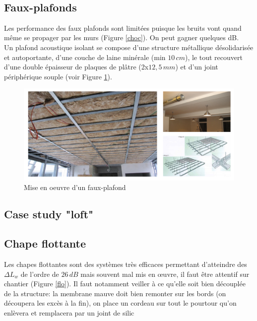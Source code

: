\documentclass[11pt]{report}
\begin{document}
\vspace{5mm}
\\


\subsection{Faux-plafonds}
\label{faux}
Les performance des faux plafonds sont limitées puisque les bruits vont quand même se propager par les murs (Figure \ref{choc}). On peut gagner quelques dB.\\

Un plafond acoustique isolant se compose d'une structure métallique désolidarisée et autoportante, d'une couche de laine minérale (min $10\,cm$), le tout recouvert d'une double épaisseur de plaques de plâtre (2x$12,5\,mm$) et d'un joint périphérique souple (voir Figure \ref{fp}).

\begin{figure}[ht]
\centering
\includegraphics[width=\linewidth]{fp}
\caption{Mise en oeuvre d'un faux-plafond}
\label{fp}
\end{figure}


\subsection{Case study "loft"}

\subsection{Chape flottante}
Les chapes flottantes sont des systèmes très efficaces permettant d'atteindre des $\Delta L_w$ de l'ordre de $26\,dB$ mais souvent mal mis en œuvre, il faut être attentif sur chantier (Figure \ref{flo}). Il faut notamment veiller à ce qu'elle soit bien découplée de la structure: la membrane mauve doit bien remonter sur les bords (on découpera les excès à la fin), on place un cordeau sur tout le pourtour qu'on enlèvera et remplacera par un joint de silic
\end{document}
